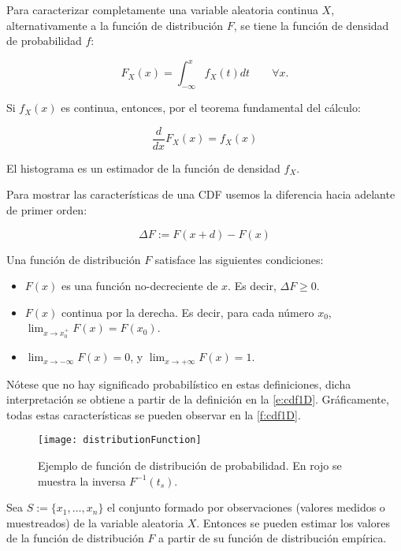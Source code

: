 Para caracterizar completamente una variable aleatoria continua $X$, alternativamente a la funci\'on de distribuci\'on $F$, se tiene la funci\'on de densidad de probabilidad $f$:

\begin{equation}
	F_X(x) = \int_{-\infty}^x f_X(t)dt \qquad \forall x.
\end{equation}

Si $f_X(x)$ es continua, entonces, por el teorema fundamental del c\'alculo:

\begin{equation}
	\frac{d}{dx}F_X(x) = f_X(x)
\end{equation}

El histograma es un estimador de la funci\'on de densidad $f_X$.

Para mostrar las caracter\'isticas de una CDF usemos la diferencia hacia adelante de primer orden:

\begin{equation}
\label{e:ForwDiff} %
\Delta F :=F(x+d)-F(x)
\end{equation}

Una funci\'on de distribuci\'on $F$ satisface las siguientes condiciones:

\begin{itemize}
	\item $F(x)$ es una funci\'on no-decreciente de $x$. Es decir, $\Delta F \ge 0$.
	\item $F(x)$ continua por la derecha. Es decir, para cada n\'umero $x_0$, $\lim_{x \to x_0^+}F(x) = F(x_0)$.
	\item $\lim_{x \to -\infty}F(x) = 0$, y  $\lim_{x \to +\infty}F(x) = 1$.
\end{itemize}

N\'otese que no hay significado probabil\'istico en estas definiciones, dicha interpretaci\'on se obtiene a partir de la definici\'on en la \autoref{e:cdf1D}. Gr\'aficamente, todas estas caracter\'isticas se pueden observar en la \autoref{f:cdf1D}.

\begin{figure}
	\centering
	\texttt{[image: distributionFunction]}
        \caption{Ejemplo de funci\'on de distribuci\'on de probabilidad. En rojo se muestra la inversa $F^{-1}(t_s)$.}
	\label{f:cdf1D}
\end{figure}

Sea $S:= \{x_1, \ldots, x_n\}$ el conjunto formado por observaciones (valores medidos o muestreados) de la variable aleatoria $X$. Entonces se pueden estimar los valores de la funci\'on de distribuci\'on $F$ a partir de su funci\'on de distribuci\'on emp\'irica.

